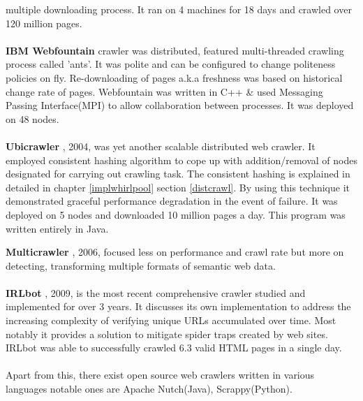 multiple downloading process. It ran on 4 machines for 18 days and crawled over 120 million pages.
\\
\\
\textbf{IBM Webfountain} crawler was distributed, featured multi-threaded crawling process called 'ants'.
It was polite and can be configured to change politeness policies on fly. Re-downloading of pages a.k.a
freshness was based on historical change rate of pages. Webfountain was written in C++ \& used Messaging
Passing Interface(MPI) to allow collaboration between processes. It was deployed on 48 nodes.
\\
\\
\textbf{Ubicrawler} \cite{ubicrawler}, 2004, was yet another scalable distributed web crawler. It employed
consistent hashing algorithm to cope up with addition/removal of nodes designated for carrying out crawling
task. The consistent hashing is explained in detailed in chapter \ref{implwhirlpool} section
\ref{distcrawl}. By using this technique it demonstrated graceful performance degradation in the event of
failure. It was deployed on 5 nodes and downloaded 10 million pages a day. This program was written
entirely in Java.
\\
\pagebreak

\noindent
\textbf{Multicrawler} \cite{multicrawler}, 2006, focused less on performance and crawl rate but more on
detecting, transforming multiple formats of semantic web data.
\\
\\
\textbf{IRLbot} \cite{irlbot}, 2009, is the most recent comprehensive crawler studied and implemented for
over 3 years. It discusses its own implementation to address the increasing complexity of verifying unique
URLs accumulated over time. Most notably it provides a solution to mitigate spider traps created by web sites. IRLbot was able to successfully crawled 6.3 valid HTML pages in a single day.
\\
\\
Apart from this, there exist open source web crawlers written in various languages notable ones are Apache Nutch(Java), Scrappy(Python).
